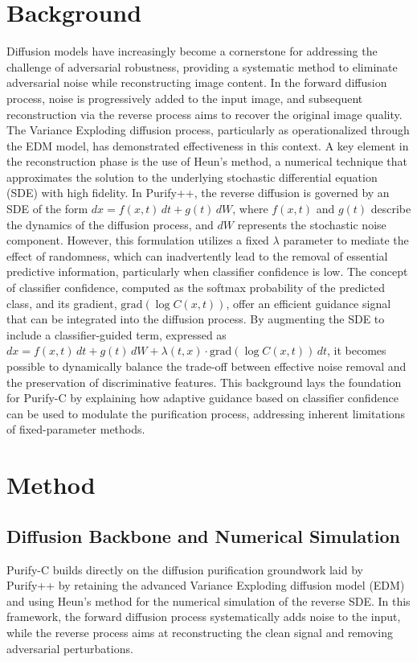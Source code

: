 \documentclass{article} %
\begin{document}
\section{Background}
\label{sec:background}
Diffusion models have increasingly become a cornerstone for addressing the challenge of adversarial robustness, providing a systematic method to eliminate adversarial noise while reconstructing image content. In the forward diffusion process, noise is progressively added to the input image, and subsequent reconstruction via the reverse process aims to recover the original image quality. The Variance Exploding diffusion process, particularly as operationalized through the EDM model\citep{Green2015}, has demonstrated effectiveness in this context. A key element in the reconstruction phase is the use of Heun's method, a numerical technique that approximates the solution to the underlying stochastic differential equation (SDE) with high fidelity. In Purify++, the reverse diffusion is governed by an SDE of the form $dx = f(x,t)\,dt + g(t)\,dW$, where $f(x,t)$ and $g(t)$ describe the dynamics of the diffusion process, and $dW$ represents the stochastic noise component. However, this formulation utilizes a fixed $\lambda$ parameter to mediate the effect of randomness, which can inadvertently lead to the removal of essential predictive information, particularly when classifier confidence is low. The concept of classifier confidence, computed as the softmax probability of the predicted class, and its gradient, \(\text{grad}(\log C(x,t))\), offer an efficient guidance signal that can be integrated into the diffusion process. By augmenting the SDE to include a classifier-guided term, expressed as $dx = f(x,t)\,dt + g(t)\,dW + \lambda(t,x) \cdot \text{grad}(\log C(x,t))\,dt$, it becomes possible to dynamically balance the trade-off between effective noise removal and the preservation of discriminative features. This background lays the foundation for Purify-C by explaining how adaptive guidance based on classifier confidence can be used to modulate the purification process, addressing inherent limitations of fixed-parameter methods.

\section{Method}
\label{sec:method}
\subsection{Diffusion Backbone and Numerical Simulation}
Purify-C builds directly on the diffusion purification groundwork laid by Purify++ by retaining the advanced Variance Exploding diffusion model (EDM)\citep{dAngelo2014} and using Heun's method\citep{LeCun1998} for the numerical simulation of the reverse SDE. In this framework, the forward diffusion process systematically adds noise to the input, while the reverse process aims at reconstructing the clean signal and removing adversarial perturbations.
\end{document}
